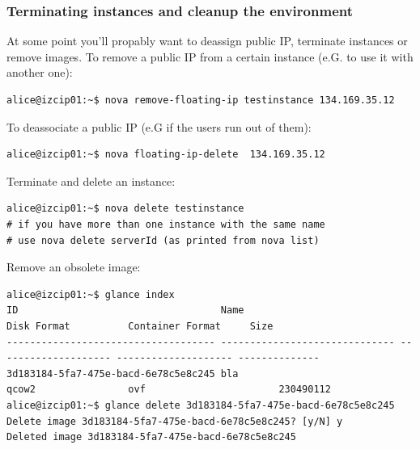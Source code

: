 \documentclass[a4paper,ngerman,bibtotocliststotoc]{scrartcl}
\begin{document}
\subsubsection{Terminating instances and cleanup the environment}
At some point you'll propably want to deassign public IP, terminate
instances or remove images.
To remove a public IP from a certain instance (e.G. to use it with
another one):
\begin{verbatim}
alice@izcip01:~$ nova remove-floating-ip testinstance 134.169.35.12
\end{verbatim}
To deassociate a public IP (e.G if the users run out of them):
\begin{verbatim}
alice@izcip01:~$ nova floating-ip-delete  134.169.35.12
\end{verbatim}
Terminate and delete an instance:
\begin{verbatim}
alice@izcip01:~$ nova delete testinstance
# if you have more than one instance with the same name 
# use nova delete serverId (as printed from nova list)
\end{verbatim}
Remove an obsolete image:
\begin{verbatim}
alice@izcip01:~$ glance index
ID                                   Name                           Disk Format          Container Format     Size          
------------------------------------ ------------------------------ -------------------- -------------------- --------------
3d183184-5fa7-475e-bacd-6e78c5e8c245 bla                            qcow2                ovf                       230490112
alice@izcip01:~$ glance delete 3d183184-5fa7-475e-bacd-6e78c5e8c245
Delete image 3d183184-5fa7-475e-bacd-6e78c5e8c245? [y/N] y
Deleted image 3d183184-5fa7-475e-bacd-6e78c5e8c245
\end{verbatim}
\end{document}
